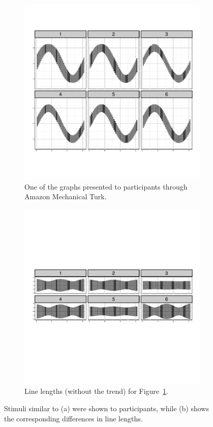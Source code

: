 \documentclass[journal]{vgtc}\usepackage{graphicx, color}
\begin{document}
\begin{figure}
\center
\begin{subfigure}[b]{.9\linewidth}\centering
\includegraphics[width=.9\linewidth]{figure/fig-stimulicorrectionsize1}
\caption{One of the graphs presented to participants through Amazon Mechanical Turk.}\label{fig:sinestimuli}
\end{subfigure}
\begin{subfigure}[b]{.9\linewidth}\centering
\includegraphics[width=.8125\linewidth]{images/fig-stimulicorrectionsize2}
\caption{Line lengths (without the trend) for Figure~\ref{fig:sinestimuli}.}\label{fig:sinestimulinotrend}
\end{subfigure}
\caption{Stimuli similar to (a) were shown to participants, while (b) shows the corresponding differences in line lengths.}
\end{figure}
\end{document}
